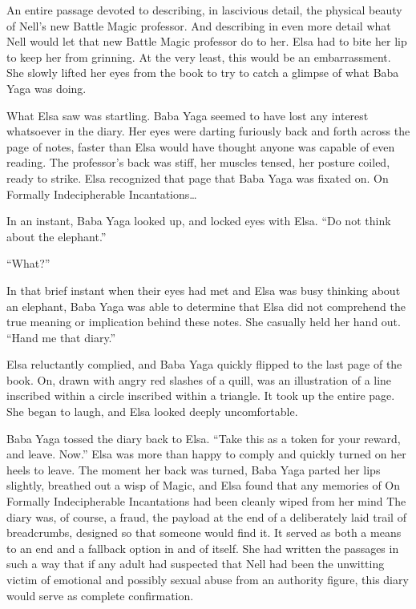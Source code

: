 An entire passage devoted to describing, in lascivious detail, the physical beauty of Nell’s new Battle Magic professor. And describing in even more detail what Nell would let that new Battle Magic professor do to her. Elsa had to bite her lip to keep her from grinning. At the very least, this would be an embarrassment. She slowly lifted her eyes from the book to try to catch a glimpse of what Baba Yaga was doing.

What Elsa saw was startling. Baba Yaga seemed to have lost any interest whatsoever in the diary. Her eyes were darting furiously back and forth across the page of notes, faster than Elsa would have thought anyone was capable of even reading. The professor’s back was stiff, her muscles tensed, her posture coiled, ready to strike. Elsa recognized that page that Baba Yaga was fixated on. On Formally Indecipherable Incantations…

In an instant, Baba Yaga looked up, and locked eyes with Elsa. “Do not think about the elephant.”

“What?”

In that brief instant when their eyes had met and Elsa was busy thinking about an elephant, Baba Yaga was able to determine that Elsa did not comprehend the true meaning or implication behind these notes. She casually held her hand out. “Hand me that diary.”

Elsa reluctantly complied, and Baba Yaga quickly flipped to the last page of the book. On, drawn with angry red slashes of a quill, was an illustration of a line inscribed within a circle inscribed within a triangle. It took up the entire page. She began to laugh, and Elsa looked deeply uncomfortable.

Baba Yaga tossed the diary back to Elsa. “Take this as a token for your reward, and leave. Now.” Elsa was more than happy to comply and quickly turned on her heels to leave. The moment her back was turned, Baba Yaga parted her lips slightly, breathed out a wisp of Magic, and Elsa found that any memories of On Formally Indecipherable Incantations had been cleanly wiped from her mind
\simpleline
The diary was, of course, a fraud, the payload at the end of a deliberately laid trail of breadcrumbs, designed so that someone would find it. It served as both a means to an end and a fallback option in and of itself. She had written the passages in such a way that if any adult had suspected that Nell had been the unwitting victim of emotional and possibly sexual abuse from an authority figure, this diary would serve as complete confirmation.

